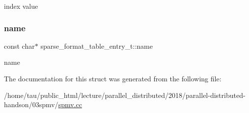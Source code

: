 index value \mbox{\label{structsparse__format__table__entry__t_aff9c31fa7933890b2d4cf0f963df2d89}} 
\subsubsection{\texorpdfstring{name}{name}}
{\footnotesize\ttfamily const char$\ast$ sparse\+\_\+format\+\_\+table\+\_\+entry\+\_\+t\+::name}

name 

The documentation for this struct was generated from the following file\+:\begin{DoxyCompactItemize}
\item 
/home/tau/public\+\_\+html/lecture/parallel\+\_\+distributed/2018/parallel-\/distributed-\/handson/03spmv/\hyperlink{spmv_8cc}{spmv.\+cc}\end{DoxyCompactItemize}
